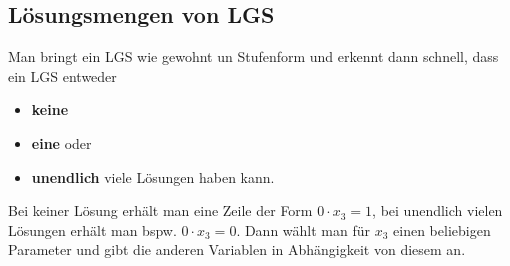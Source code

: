 \documentclass{article}
\begin{document}
\subsection{Lösungsmengen von LGS}
Man bringt ein LGS wie gewohnt un Stufenform und
erkennt dann schnell, dass ein LGS entweder
\begin{itemize}
    \item \textbf{keine}
    \item \textbf{eine} oder
    \item \textbf{unendlich} viele Lösungen haben kann.
\end{itemize}
Bei keiner Lösung erhält man eine Zeile der Form
$\displaystyle 0 \cdot x_3 = 1$, bei unendlich vielen
Lösungen erhält man bspw. $0 \cdot x_3 = 0$.
Dann wählt man für $x_3$ einen beliebigen Parameter und gibt die anderen Variablen in Abhängigkeit von diesem an.
\end{document}

